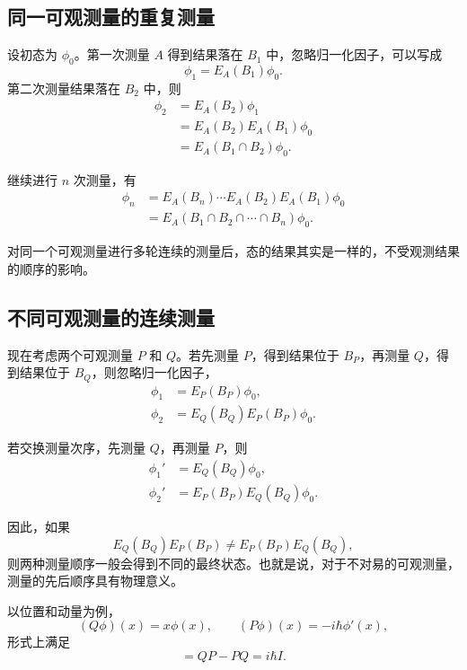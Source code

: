 \documentclass[UTF8,a4paper,11pt,openany]{ctexbook}
\begin{document}
\subsection{同一可观测量的重复测量}

设初态为 $\phi_0$。第一次测量 $A$ 得到结果落在 $B_1$ 中，忽略归一化因子，可以写成
\[
\phi_1=E_A(B_1)\phi_0.
\]
第二次测量结果落在 $B_2$ 中，则
\begin{align}
    \phi_2
    &=
    E_A(B_2)\phi_1
    \nonumber\\
    &=
    E_A(B_2)E_A(B_1)\phi_0
    \nonumber\\
    &=
    E_A(B_1\cap B_2)\phi_0.
\end{align}

继续进行 $n$ 次测量，有
\begin{align}
    \phi_n
    &=
    E_A(B_n)\cdots E_A(B_2)E_A(B_1)\phi_0
    \nonumber\\
    &=
    E_A(B_1\cap B_2\cap\cdots\cap B_n)\phi_0.
\end{align}

对同一个可观测量进行多轮连续的测量后，态的结果其实是一样的，不受观测结果的顺序的影响。

\subsection{不同可观测量的连续测量}

现在考虑两个可观测量 $P$ 和 $Q$。若先测量 $P$，得到结果位于 $B_P$，再测量 $Q$，得到结果位于 $B_Q$，则忽略归一化因子，
\begin{align}
    \phi_1
    &=
    E_P(B_P)\phi_0,
    \nonumber\\
    \phi_2
    &=
    E_Q(B_Q)E_P(B_P)\phi_0.
\end{align}

若交换测量次序，先测量 $Q$，再测量 $P$，则
\begin{align}
    \phi_1'
    &=
    E_Q(B_Q)\phi_0,
    \nonumber\\
    \phi_2'
    &=
    E_P(B_P)E_Q(B_Q)\phi_0.
\end{align}

因此，如果
\begin{equation}
    E_Q(B_Q)E_P(B_P)
    \neq
    E_P(B_P)E_Q(B_Q),
\end{equation}
则两种测量顺序一般会得到不同的最终状态。也就是说，对于不对易的可观测量，测量的先后顺序具有物理意义。

以位置和动量为例，
\[
(Q\phi)(x)=x\phi(x),
\qquad
(P\phi)(x)=-i\hbar\phi'(x),
\]
形式上满足
\begin{equation}
    [Q,P]
    =
    QP-PQ
    =
    i\hbar I.
\end{equation}
\end{document}
